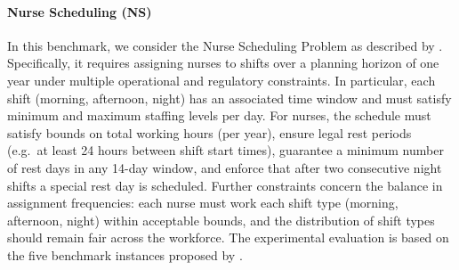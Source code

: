 \documentclass[preprint,authoryear]{elsarticle}
\theoremstyle{definition}
\begin{document}
\paragraph{Nurse Scheduling (NS)}
In this benchmark, we consider the Nurse Scheduling Problem as described by \cite{DBLP:conf/lpnmr/DodaroM17}.
Specifically, it requires assigning nurses to shifts over a planning horizon of one year under multiple operational and regulatory constraints.
In particular, each shift (morning, afternoon, night) has an associated time window and must satisfy minimum and maximum staffing levels per day.
For nurses, the schedule must satisfy bounds on total working hours (per year), ensure legal rest periods (e.g.\ at least 24 hours between shift start times), guarantee a minimum number of rest days in any 14-day window, and enforce that after two consecutive night shifts a special rest day is scheduled. 
Further constraints concern the balance in assignment frequencies: each nurse must work each shift type (morning, afternoon, night) within acceptable bounds, and the distribution of shift types should remain fair across the workforce.
%
The experimental evaluation is based on the five benchmark instances proposed by \cite{DBLP:conf/lpnmr/DodaroM17}.
\end{document}
